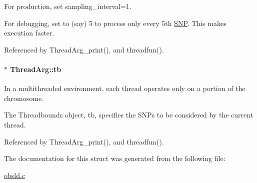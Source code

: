 For production, set sampling\-\_\-interval=1. 

For debugging, set to (say) 5 to process only every 5th \hyperlink{struct_s_n_p}{S\-N\-P}. This makes execution faster. 

Referenced by Thread\-Arg\-\_\-print(), and threadfun().

\hypertarget{struct_thread_arg_ac4848e29e694d7a9c5b0b09896cc3f37}{
\paragraph[{tb}]{$\ast$ Thread\-Arg\-::tb}}\label{struct_thread_arg_ac4848e29e694d7a9c5b0b09896cc3f37}


In a multithreaded environment, each thread operates only on a portion of the chromosome. 

The Threadbounds object, tb, specifies the S\-N\-Ps to be considered by the current thread. 

Referenced by Thread\-Arg\-\_\-print(), and threadfun().



The documentation for this struct was generated from the following file\-:\begin{DoxyCompactItemize}
\item 
\hyperlink{obsld_8c}{obsld.\-c}\end{DoxyCompactItemize}
